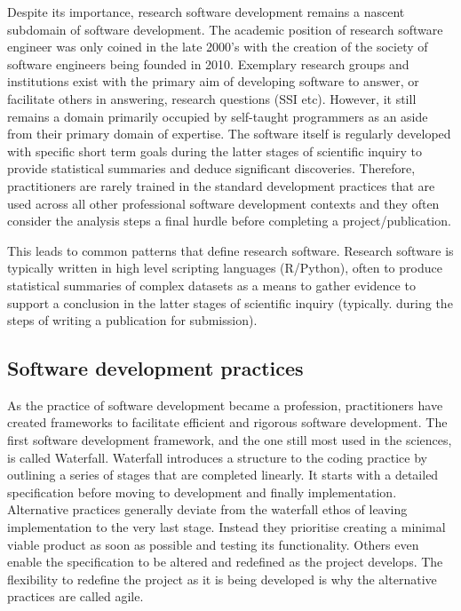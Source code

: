 \documentclass{SBCbookchapter}
\begin{document}
Despite its importance, research software development remains a nascent subdomain of software development. The academic position of research software engineer was only coined in the late 2000's \cite{Prause2010} with the creation of the society of software engineers being founded in 2010. Exemplary research groups and institutions exist with the primary aim of developing software to answer, or facilitate others in answering, research questions (SSI etc). However, it still remains a domain primarily occupied by self-taught programmers as an aside from their primary domain of expertise.  The software itself is regularly developed with specific short term goals during the latter stages of scientific inquiry to provide statistical summaries and deduce significant discoveries. Therefore, practitioners are rarely trained in the standard development practices that are used across all other professional software development contexts and they often consider the analysis steps a final hurdle before completing a project/publication.

This leads to common patterns that define research software. Research software is typically written in high level scripting languages (R/Python), often to produce statistical summaries of complex datasets as a means to gather evidence to support a conclusion in the latter stages of scientific inquiry (typically. during the steps of writing a publication for submission).

\subsection{Software development practices}

As the practice of software development became a profession, practitioners have created frameworks to facilitate efficient and rigorous software development.
The first software development framework, and the one still most used in the sciences, is called Waterfall.
Waterfall introduces a structure to the coding practice by outlining a series of stages that are completed linearly.
It starts with a detailed specification before moving to development and finally implementation.
Alternative practices generally deviate from the waterfall ethos of leaving implementation to the very last stage.
Instead they prioritise creating a minimal viable product as soon as possible and testing its functionality.
Others even enable the specification to be altered and redefined as the project develops.
The flexibility to redefine the project as it is being developed is why the alternative practices are called agile. 
\end{document}
